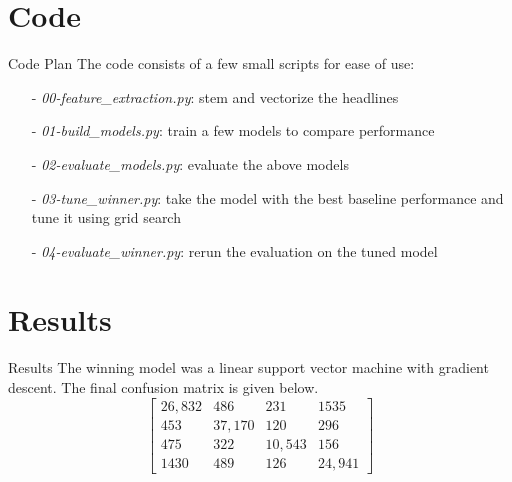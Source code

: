 \documentclass[11pt]{beamer}
\begin{document}
\section{Code}
\begin{frame}{Code Plan}
	The code consists of a few small scripts for ease of use:
	\begin{itemize}
		\item[-] \textit{00-feature\_extraction.py}: stem and vectorize the headlines
		\item[-] \textit{01-build\_models.py}: train a few models to compare performance
		\item[-] \textit{02-evaluate\_models.py}: evaluate the above models
		\item[-] \textit{03-tune\_winner.py}: take the model with the best baseline performance and tune it using grid search
		\item[-] \textit{04-evaluate\_winner.py}: rerun the evaluation on the tuned model
	\end{itemize}
\end{frame}

\section{Results}
\begin{frame}{Results}
	The winning model was a linear support vector machine with gradient descent. The final confusion matrix is given below.
\[
	\begin{bmatrix}
		26,832 & 486 & 231 & 1535 \\ 
		453 & 37,170 & 120 & 296 \\
		475 & 322 & 10,543 & 156 \\
		1430 & 489 & 126 & 24,941
	\end{bmatrix}
\]
\end{frame}
\end{document}

